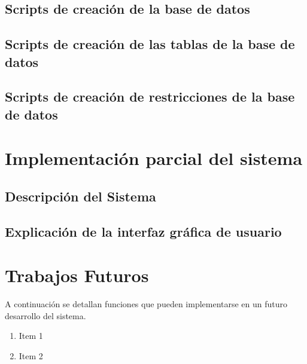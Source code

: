 \documentclass[11pt]{article}
\begin{document}
\subsection{Scripts de creación de la base de datos}

\subsection{Scripts de creación de las tablas de la base de datos}

\subsection{Scripts de creación de restricciones de la base de datos}

\section{Implementación parcial del sistema}
\subsection{Descripción del Sistema}

\subsection{Explicación de la interfaz gráfica de usuario}

\section{Trabajos Futuros}
A continuación se detallan funciones que pueden implementarse en un futuro desarrollo del sistema.
\begin{enumerate}
    \item Item 1
    \item Item 2
\end{enumerate}
\end{document}
